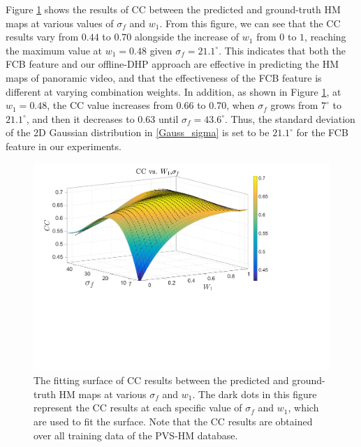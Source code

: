 \documentclass[10pt,journal,compsoc]{IEEEtran}
\begin{document}
Figure \ref{fitting_surface} shows the results of  CC between the predicted and ground-truth HM maps at various values of $\sigma_f$ and $w_1$. From this figure, we can see that the CC results vary from $0.44$ to $0.70$ alongside the increase of $w_1$ from $0$ to $1$, reaching the maximum value at $w_1=0.48$ given $\sigma_f=21.1^\circ$. This indicates that both the FCB feature and our offline-DHP approach are effective in predicting the HM maps of panoramic video, and that the effectiveness of the FCB feature is different at varying combination weights. In addition, as shown in Figure \ref{fitting_surface}, at $w_1=0.48$, the CC value increases from 0.66 to 0.70, when $\sigma_f$ grows from $7^\circ$ to $21.1^\circ$, and then it decreases to 0.63 until $\sigma_f = 43.6^\circ$. Thus, the standard deviation of the 2D Gaussian distribution in \eqref{Gauss_sigma} is set to be $21.1^\circ$ for the FCB feature in our experiments.


\begin{figure}
\vspace{-1em}
	\begin{center}
		\centerline{\includegraphics[width=.8\columnwidth]{figures/experiment/Fitting}}%
      \vspace{-1em}
		\caption{\footnotesize{The fitting surface of CC results between the predicted and ground-truth HM maps at various $\sigma_f$ and $w_1$. The dark dots in this figure represent the CC results at each specific value of $\sigma_f$ and $w_1$, which are used to fit the surface. Note that the CC results are obtained over all training data of the PVS-HM database.}}
		\label{fitting_surface}
	\end{center}
\vspace{-2em}
\end{figure}
\end{document}
